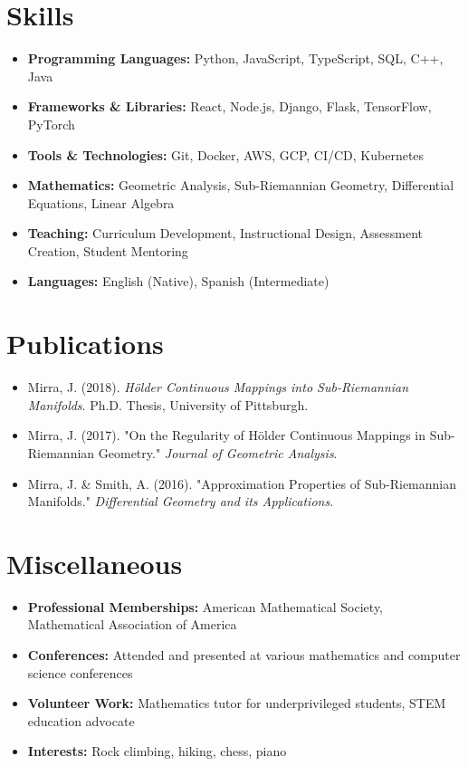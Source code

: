 \documentclass[11pt]{article}
\begin{document}
\section{Skills}
\begin{itemize}[leftmargin=*]
  \item \textbf{Programming Languages:} Python, JavaScript, TypeScript, SQL, C++, Java
  \item \textbf{Frameworks \& Libraries:} React, Node.js, Django, Flask, TensorFlow, PyTorch
  \item \textbf{Tools \& Technologies:} Git, Docker, AWS, GCP, CI/CD, Kubernetes
  \item \textbf{Mathematics:} Geometric Analysis, Sub-Riemannian Geometry, Differential Equations, Linear Algebra
  \item \textbf{Teaching:} Curriculum Development, Instructional Design, Assessment Creation, Student Mentoring
  \item \textbf{Languages:} English (Native), Spanish (Intermediate)
\end{itemize}

\section{Publications}
\begin{itemize}[leftmargin=*]
  \item Mirra, J. (2018). \emph{Hölder Continuous Mappings into Sub-Riemannian Manifolds}. Ph.D. Thesis, University of Pittsburgh.
  \item Mirra, J. (2017). "On the Regularity of Hölder Continuous Mappings in Sub-Riemannian Geometry." \emph{Journal of Geometric Analysis}.
  \item Mirra, J. \& Smith, A. (2016). "Approximation Properties of Sub-Riemannian Manifolds." \emph{Differential Geometry and its Applications}.
\end{itemize}

\section{Miscellaneous}
\begin{itemize}[leftmargin=*]
  \item \textbf{Professional Memberships:} American Mathematical Society, Mathematical Association of America
  \item \textbf{Conferences:} Attended and presented at various mathematics and computer science conferences
  \item \textbf{Volunteer Work:} Mathematics tutor for underprivileged students, STEM education advocate
  \item \textbf{Interests:} Rock climbing, hiking, chess, piano
\end{itemize}
\end{document}

